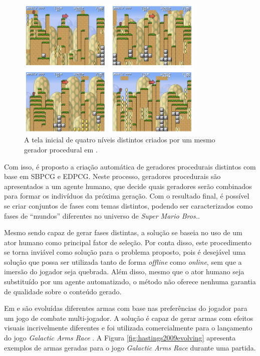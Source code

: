 \begin{figure}[htb]
	\begin{center}
		\includegraphics[width=0.8\textwidth]{Imagens/kerssemakers2012procedural.jpg}
		\caption{A tela inicial de quatro níveis distintos criados por um mesmo gerador procedural em \cite{kerssemakers2012procedural}.}
		\label{fig:kerssemakers2012procedural}
	\end{center}
\end{figure}

Com isso, é proposto a criação automática de geradores procedurais distintos com base em SBPCG e EDPCG. Neste processo, geradores procedurais são apresentados a um agente humano, que decide quais geradores serão combinados para formar os indivíduos da próxima geração. Com o resultado final, é possível se criar conjuntos de fases com temas distintos, podendo ser caracterizados como fases de “mundos” diferentes no universo de \emph{Super Mario Bros.}.

Mesmo sendo capaz de gerar fases distintas, a solução se baseia no uso de um ator humano como principal fator de seleção. Por conta disso, este procedimento se torna inviável como solução para o problema proposto, pois é desejável uma solução que possa ser utilizada tanto de forma \emph{offline} como \emph{online}, sem que a imersão do jogador seja quebrada. Além disso, mesmo que o ator humano seja substituído por um agente automatizado, o método não oferece nenhuma garantia de qualidade sobre o conteúdo gerado.

Em \cite{hastings2009evolving} e \cite{hastings2009automatic} são evoluídas diferentes armas com base nas preferências do jogador para um jogo de combate multi-jogador. A solução é capaz de gerar armas com efeitos visuais incrivelmente diferentes e foi utilizada comercialmente para o lançamento do jogo \emph{Galactic Arms Race} \cite{game:galacticarmsrace}. A Figura \ref{fig:hastings2009evolving} apresenta exemplos de armas geradas para o jogo \emph{Galactic Arms Race} durante uma partida.

